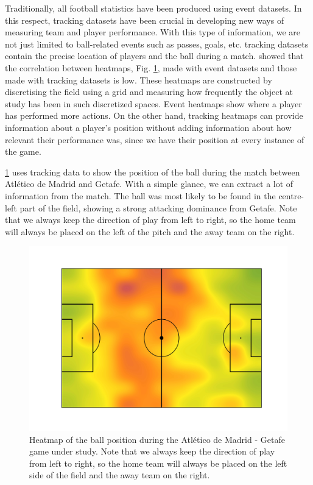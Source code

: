 \documentclass[
  10pt,
  twoside,nohyper]{book}
\begin{document}
Traditionally, all football statistics have been produced using event datasets. In this respect, tracking datasets have been crucial in developing new ways of measuring team and player performance. With this type of information, we are not just limited to ball-related events such as passes, goals, etc. tracking datasets contain the precise location of players and the ball during a match. \autocite{GARRIDO2022112827} showed that the correlation between heatmaps, Fig. \ref{fig:heatmap}, made with event datasets and those made with tracking datasets is low. These heatmaps are constructed by discretising the field using a grid and measuring how frequently the object at study has been in such discretized spaces. Event heatmaps show where a player has performed more actions. On the other hand, tracking heatmaps can provide information about a player's position without adding information about how relevant their performance was, since we have their position at every instance of the game.

\ref{fig:heatmap} uses tracking data to show the position of the ball during the match between Atlético de Madrid and Getafe. With a simple glance, we can extract a lot of information from the match. The ball was most likely to be found in the centre-left part of the field, showing a strong attacking dominance from Getafe. Note that we always keep the direction of play from left to right, so the home team will always be placed on the left of the pitch and the away team on the right.

\begin{figure}[H]

{\centering \includegraphics[width=0.8\linewidth,]{imagenes/Heatmap} 

}

\caption{Heatmap of the ball position during the Atlético de Madrid - Getafe game under study. Note that we always keep the direction of play from left to right, so the home team will always be placed on the left side of the field and the away team on the right.}\label{fig:heatmap}
\end{figure}
\end{document}
